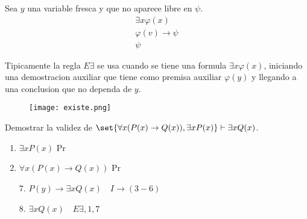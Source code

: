 \begin{definition}
	Sea \(y \) una variable fresca y que no aparece libre en \(\psi \).
	\[
		\begin{array}{c}
			\exists  x \varphi(x) \\
			\varphi(v) \to \psi   \\ \hline
			\psi
		\end{array}
	\]
\end{definition}

\begin{remark}
	Tipicamente la regla \(E \exists  \) se usa cuando se tiene una formula \(\exists  x \varphi(x) \), iniciando una demostracion auxiliar que tiene como premisa auxiliar \(\varphi(y )\) y llegando a una conclusion que no dependa de \(y \).
	\begin{figure}[H]
		\centering
		\texttt{[image: existe.png]}
		\label{fig:}
	\end{figure}
\end{remark}

\begin{example}
	Demostrar la validez de \(\set{\forall x (P(x) \to Q(x)), \exists x P(x)} \vdash \exists x Q(x )\).

	\begin{enumerate}
		\item \(\exists x P(x )\) Pr
		\item \(\forall x (P(x) \to Q(x ))\) Pr
	\end{enumerate}
	\begin{enumerate}
		\item[7.] \(P(y) \to \exists x Q(x) \quad I\to (3-6 )\)
		\item[8.] \(\exists x Q(x) \quad E \exists , 1,7 \)
	\end{enumerate}
\end{example}

